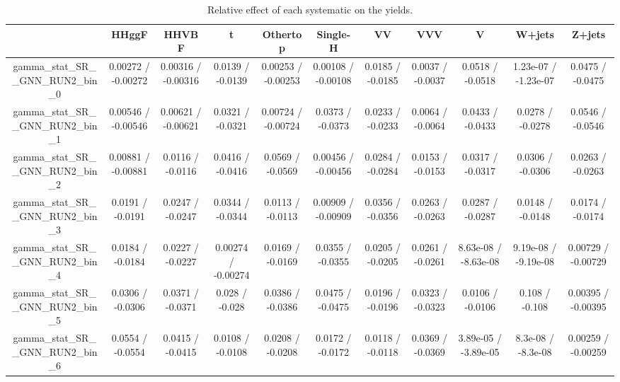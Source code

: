 \documentclass[10pt]{article}
\begin{document}
\begin{table}[htbp]
\begin{center}
\begin{tabular}{|c|c|c|c|c|c|c|c|c|c|c|}
\hline 
      & HHggF      & HHVBF      & t      & Othertop      & Single-H      & VV      & VVV      & V      & W+jets      & Z+jets \\ 
\hline 
  gamma_stat_SR__GNN_RUN2_bin_0 & 0.00272 / -0.00272 & 0.00316 / -0.00316 & 0.0139 / -0.0139 & 0.00253 / -0.00253 & 0.00108 / -0.00108 & 0.0185 / -0.0185 & 0.0037 / -0.0037 & 0.0518 / -0.0518 & 1.23e-07 / -1.23e-07 & 0.0475 / -0.0475 \\ 
  gamma_stat_SR__GNN_RUN2_bin_1 & 0.00546 / -0.00546 & 0.00621 / -0.00621 & 0.0321 / -0.0321 & 0.00724 / -0.00724 & 0.0373 / -0.0373 & 0.0233 / -0.0233 & 0.0064 / -0.0064 & 0.0433 / -0.0433 & 0.0278 / -0.0278 & 0.0546 / -0.0546 \\ 
  gamma_stat_SR__GNN_RUN2_bin_2 & 0.00881 / -0.00881 & 0.0116 / -0.0116 & 0.0416 / -0.0416 & 0.0569 / -0.0569 & 0.00456 / -0.00456 & 0.0284 / -0.0284 & 0.0153 / -0.0153 & 0.0317 / -0.0317 & 0.0306 / -0.0306 & 0.0263 / -0.0263 \\ 
  gamma_stat_SR__GNN_RUN2_bin_3 & 0.0191 / -0.0191 & 0.0247 / -0.0247 & 0.0344 / -0.0344 & 0.0113 / -0.0113 & 0.00909 / -0.00909 & 0.0356 / -0.0356 & 0.0263 / -0.0263 & 0.0287 / -0.0287 & 0.0148 / -0.0148 & 0.0174 / -0.0174 \\ 
  gamma_stat_SR__GNN_RUN2_bin_4 & 0.0184 / -0.0184 & 0.0227 / -0.0227 & 0.00274 / -0.00274 & 0.0169 / -0.0169 & 0.0355 / -0.0355 & 0.0205 / -0.0205 & 0.0261 / -0.0261 & 8.63e-08 / -8.63e-08 & 9.19e-08 / -9.19e-08 & 0.00729 / -0.00729 \\ 
  gamma_stat_SR__GNN_RUN2_bin_5 & 0.0306 / -0.0306 & 0.0371 / -0.0371 & 0.028 / -0.028 & 0.0386 / -0.0386 & 0.0475 / -0.0475 & 0.0196 / -0.0196 & 0.0323 / -0.0323 & 0.0106 / -0.0106 & 0.108 / -0.108 & 0.00395 / -0.00395 \\ 
  gamma_stat_SR__GNN_RUN2_bin_6 & 0.0554 / -0.0554 & 0.0415 / -0.0415 & 0.0108 / -0.0108 & 0.0208 / -0.0208 & 0.0172 / -0.0172 & 0.0118 / -0.0118 & 0.0369 / -0.0369 & 3.89e-05 / -3.89e-05 & 8.3e-08 / -8.3e-08 & 0.00259 / -0.00259 \\ 
\hline 
\end{tabular} 
\caption{Relative effect of each systematic on the yields.} 
\end{center} 
\end{table} 
\end{document}
